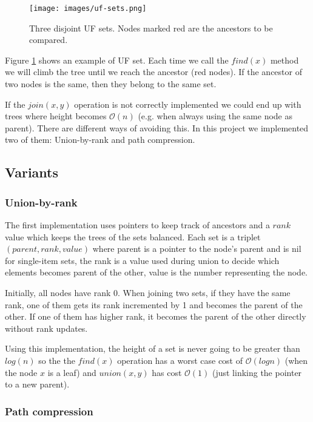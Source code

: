 \documentclass[a4paper,10pt,table,xcdraw]{article}
\begin{document}
\begin{figure}[H]
\centering
\texttt{[image: images/uf-sets.png]}
\caption{ Three disjoint UF sets. Nodes marked red are the ancestors to be compared.}
\label{fig:uf-set}
\end{figure}

Figure \ref{fig:uf-set} shows an example of UF set. Each time we call the $find(x)$ method we will climb the tree until we reach the ancestor (red nodes). If the ancestor of two nodes is the same, then they belong to the same set. 

If the $join(x,y)$ operation is not correctly implemented we could end up with trees where height becomes $\mathcal{O} (n)$ (e.g. when always using the same node as parent). There are different ways of avoiding this. In this project we implemented two of them: Union-by-rank and path compression.


\subsection{Variants}

\subsubsection{Union-by-rank}

The first implementation uses pointers to keep track of ancestors and a $rank$ value which keeps the trees of the sets balanced. Each set is a triplet $(parent, rank, value)$ where parent is a pointer to the node's parent and is nil for single-item sets, the rank is a value used during union to decide which elements becomes parent of the other, value is the number representing the node. 

Initially, all nodes have rank 0. When joining two sets, if they have the same rank, one of them gets its rank incremented by 1 and becomes the parent of the other. If one of them has higher rank, it becomes the parent of the other directly without rank updates.

Using this implementation, the height of a set is never going to be greater than $log(n)$ so the the $find(x)$ operation has a worst case cost of $\mathcal{O} (log n)$ (when the node $x$ is a leaf) and $union(x,y)$ has cost $\mathcal{O} (1)$ (just linking the pointer to a new parent).

\subsubsection{Path compression}
\end{document}
